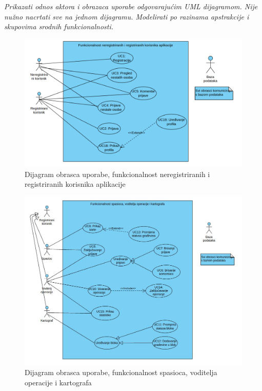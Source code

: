 					\textit{Prikazati odnos aktora i obrazaca uporabe odgovarajućim UML dijagramom. Nije nužno nacrtati sve na jednom dijagramu. Modelirati po razinama apstrakcije i skupovima srodnih funkcionalnosti.}
					
					
					\begin{figure}[h!]      \includegraphics[width=\linewidth]{dijagrami/UML1.vpd.jpg}
					\caption{Dijagram obrasca uporabe, funkcionalnost neregistriranih i registriranih korisnika aplikacije}
	                \end{figure}
	                
				    \begin{figure}[H] \includegraphics[width=\linewidth]{dijagrami/UML2.vpd.jpg}
				    \caption{Dijagram obrasca uporabe, funkcionalnost spasioca, voditelja operacije i kartografa}
				    \end{figure}
				    
